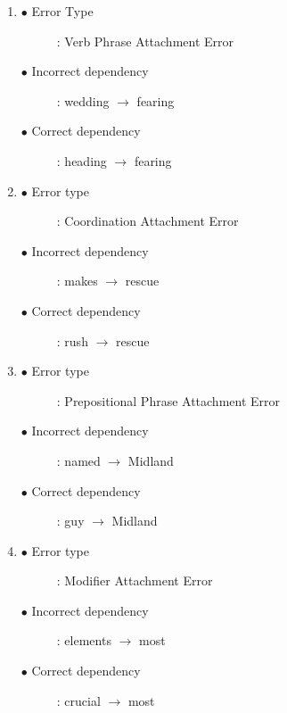 \documentclass[]{article}
\begin{document}
\begin{enumerate}
\begin{enumerate}
		\begin{enumerate}
				\item 
					\begin{description}
						\item[$\bullet$ Error Type] : Verb Phrase Attachment Error
						\item[$\bullet$ Incorrect dependency] : wedding $\rightarrow$ fearing
						\item[$\bullet$ Correct dependency] : heading $\rightarrow$ fearing
					\end{description}
				\item 
					\begin{description}
						\item[$\bullet$ Error type] : Coordination Attachment Error
						\item[$\bullet$ Incorrect dependency] : makes $\rightarrow$ rescue
						\item[$\bullet$ Correct dependency] : rush $\rightarrow$ rescue
					\end{description}
				\item 
					\begin{description}
						\item[$\bullet$ Error type] : Prepositional Phrase Attachment Error
						\item[$\bullet$ Incorrect dependency] : named $\rightarrow$ Midland
						\item[$\bullet$ Correct dependency] : guy $\rightarrow$ Midland
					\end{description}
				\item 
					\begin{description}
						\item[$\bullet$ Error type] : Modifier Attachment Error
						\item[$\bullet$ Incorrect dependency] : elements $\rightarrow$ most
						\item[$\bullet$ Correct dependency] : crucial $\rightarrow$ most
					\end{description}
			\end{enumerate}	
	\end{enumerate}	
\end{enumerate}
\end{document}
